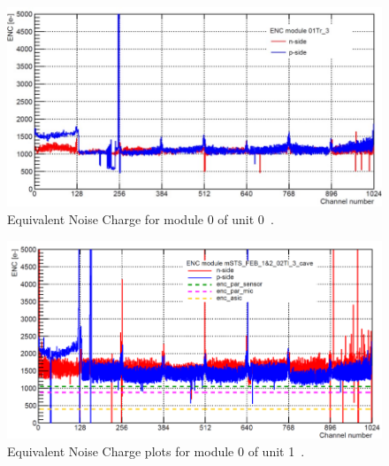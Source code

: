 \begin{figure}[h!]
\centering
\includegraphics[width=0.75\columnwidth]{Chapter6/DCS/images/U0M1_ENC.jpg}
\caption{Equivalent Noise Charge for module 0 of unit 0~\cite{RodriguezRodriguez2020}.}
\label{fig_msts_ENC1}
\end{figure}

\begin{figure}[h!]
\centering
\includegraphics[width=0.75\columnwidth]{Chapter6/DCS/images/U1M1_ENC.png}
\caption{Equivalent Noise Charge plots for module 0 of unit 1~\cite{RodriguezRodriguez2020}.}
\label{fig_msts_ENC2}
\end{figure}
\newpage
